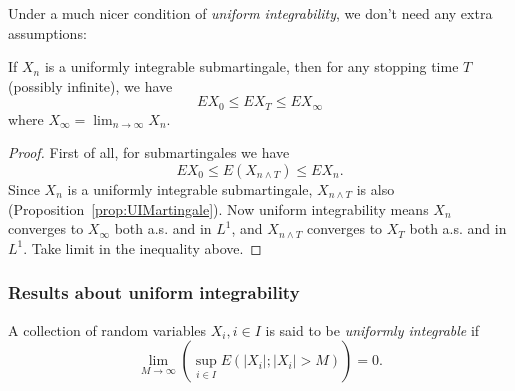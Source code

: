 Under a much nicer condition of \textit{uniform integrability}, we don't need any extra assumptions:
\begin{theorem}
	\label{thm:OptionalStoppingThm}
	If $X_n$ is a uniformly integrable submartingale, then for any stopping time $T$ (possibly infinite), we have 
	\[
		E X_0 \le  E X_T \le E X_\infty
	\] 
	where $X_\infty  = \lim _{n\to \infty } X_n$.
\end{theorem}

\begin{proof}
	First of all, for submartingales we have
	\[
		E X_0 \le  E(X_{n \wedge T}) \le  E X_n
	.\] 
	Since $X_n$ is a uniformly integrable submartingale, $X_{n \wedge T}$ is also (Proposition~\ref{prop:UIMartingale}). Now uniform integrability means $X_n$ converges to $X_\infty $ both a.s. and in $L^1$, and $X_{n \wedge T}$ converges to $X_T$ both a.s. and in $L^1$. Take limit in the inequality above.
\end{proof}

\subsubsection{Results about uniform integrability}

\begin{definition}
	A collection of random variables $X_i, i \in I$ is said to be \textit{uniformly integrable} if
	\[
		\lim_{M \to \infty } \left( \sup _{i \in I} E\left( |X_i| ; |X_i| > M \right)  \right)  = 0
	.\] 
\end{definition}

